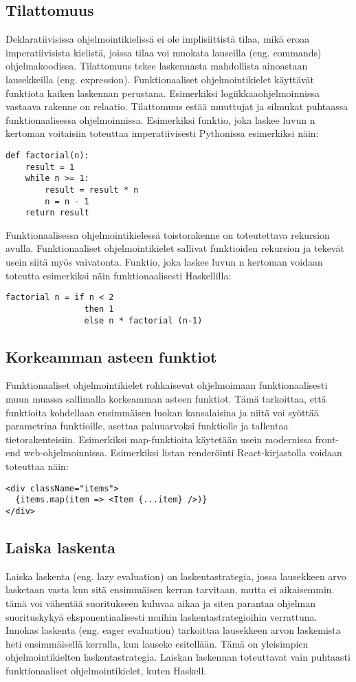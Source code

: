 \subsection{Tilattomuus}
Deklaratiivisissa ohjelmointikielissä ei ole implisiittistä tilaa, mikä eroaa imperatiivisista kielistä, joissa tilaa
voi muokata lauseilla (eng. commands) ohjelmakoodissa. Tilattomuus tekee laskennasta mahdollista ainoastaan lausekkeilla
(eng. expression). Funktionaaliset ohjelmointikielet käyttävät funktiota kaiken laskennan perustana. Esimerkiksi
logiikkaaohjelmoinnissa vastaava rakenne on relaatio. Tilattomuus estää muuttujat ja silmukat puhtaassa
funktionaalisessa ohjelmoinnissa. Esimerkiksi funktio, joka laskee luvun n kertoman voitaisiin toteuttaa
imperatiivisesti Pythonissa esimerkiksi näin:
\begin{verbatim}
def factorial(n):
    result = 1
    while n >= 1:
        result = result * n
        n = n - 1
    return result
\end{verbatim}
Funktionaalisessa ohjelmointikielessä toistorakenne on toteutettava rekursion avulla. Funktionaaliset ohjelmointikielet
sallivat funktioiden rekursion ja tekevät usein siitä myös vaivatonta.\cite{hudak} Funktio, joka laskee luvun n kertoman
voidaan toteutta esimerkiksi näin funktionaalisesti Haskellilla:
\begin{verbatim}
factorial n = if n < 2
                then 1
                else n * factorial (n-1)
\end{verbatim}

\subsection{Korkeamman asteen funktiot}
Funktionaaliset ohjelmointikielet rohkaisevat ohjelmoimaan funktionaalisesti muun muassa sallimalla korkeamman asteen
funktiot. Tämä tarkoittaa, että funktioita kohdellaan ensimmäisen luokan kansalaisina ja niitä voi syöttää parametrina
funktioille, asettaa paluuarvoksi funktiolle ja tallentaa tietorakenteisiin.\cite{hudak} Esimerkiksi map-funktioita
käytetään usein modernissa front-end web-ohjelmoinnissa\cite{functionalreact}. Esimerkiksi listan renderöinti
React-kirjastolla voidaan toteuttaa näin:
\begin{verbatim}
<div className="items">
  {items.map(item => <Item {...item} />)}
</div>
\end{verbatim}

\subsection{Laiska laskenta}
Laiska laskenta (eng. lazy evaluation) on laskentastrategia, jossa lausekkeen arvo lasketaan vasta kun sitä ensimmäisen
kerran tarvitaan, mutta ei aikaisemmin. tämä voi vähentää suoritukseen kuluvaa aikaa ja siten parantaa ohjelman
suorituskykyä eksponentiaalisesti muihin laskentastrategioihin verrattuna. Innokas laskenta (eng. eager evaluation)
tarkoittaa lausekkeen arvon laskemista heti ensimmäisellä kerralla, kun lauseke esitellään. Tämä on yleisimpien
ohjelmointikielten laskentastrategia. Laiskan laskennan toteuttavat vain puhtaasti funktionaaliset ohjelmointikielet,
kuten Haskell.

